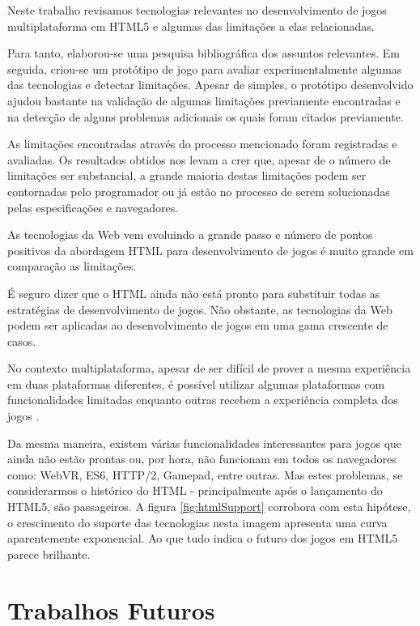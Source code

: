 Neste trabalho revisamos tecnologias relevantes no desenvolvimento
de jogos multiplataforma em HTML5 e algumas das limitações a elas
relacionadas.

Para tanto, elaborou-se uma pesquisa bibliográfica
dos assuntos relevantes. Em seguida, criou-se um protótipo de jogo
para avaliar experimentalmente algumas das tecnologias e detectar
limitações. Apesar de simples, o protótipo desenvolvido ajudou
bastante na validação de algumas limitações previamente encontradas
e na detecção de alguns problemas adicionais os quais foram citados
previamente.

As limitações encontradas através do processo mencionado foram
registradas e avaliadas. Os resultados obtidos nos levam a crer que,
apesar de o número de limitações ser substancial, a grande maioria
destas limitações podem ser contornadas pelo programador ou já estão
no processo de serem solucionadas pelas especificações e navegadores.

As tecnologias da Web vem evoluindo a grande passo e número de pontos
positivos da abordagem HTML para desenvolvimento de jogos é muito
grande em comparação as limitações.

É seguro dizer que o HTML ainda não está pronto para substituir todas
as estratégias de desenvolvimento de jogos. Não obstante, as tecnologias
da Web podem ser aplicadas ao desenvolvimento de jogos em uma gama
crescente de casos.

No contexto multiplataforma, apesar de ser difícil de prover a
mesma experiência em duas plataformas diferentes, é possível
utilizar algumas plataformas com funcionalidades limitadas enquanto
outras recebem a experiência completa dos jogos \autocite[p.
1]{currentStateCrossPlatform}.


Da mesma maneira, existem várias funcionalidades interessantes para
jogos que ainda não estão prontas ou, por hora, não funcionam
em todos os navegadores como: WebVR, ES6, HTTP/2, Gamepad, entre
outras. Mas estes problemas, se considerarmos o histórico do HTML -
principalmente após o lançamento do HTML5, são passageiros. A figura
\ref{fig:htmlSupport} corrobora com esta hipótese, o crescimento do
suporte das tecnologias nesta imagem apresenta uma curva aparentemente
exponencial. Ao que tudo indica o futuro dos jogos em HTML5 parece
brilhante.

\section{Trabalhos Futuros}

